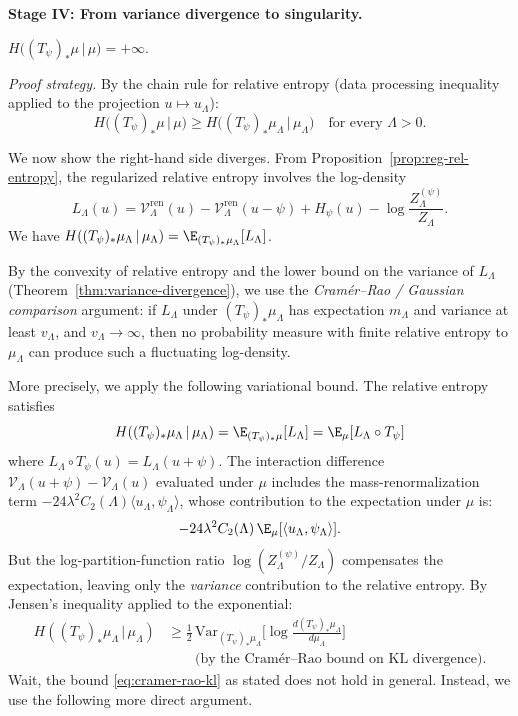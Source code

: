 \bigskip
\noindent\textbf{Stage IV: From variance divergence to singularity.}

\begin{theorem}\label{thm:rel-entropy-diverges}
$H\bigl((T_\psi)_*\mu \,\big|\, \mu\bigr) = +\infty$.
\end{theorem}

\noindent\textit{Proof strategy.}
By the chain rule for relative entropy (data processing inequality applied to
the projection $u \mapsto u_\Lambda$):
\begin{equation}\label{eq:chain-rule}
  H\bigl((T_\psi)_*\mu \,\big|\, \mu\bigr)
  \geq H\bigl((T_\psi)_*\mu_\Lambda \,\big|\, \mu_\Lambda\bigr)
  \quad \text{for every } \Lambda > 0.
\end{equation}

We now show the right-hand side diverges. From Proposition~\ref{prop:reg-rel-entropy},
the regularized relative entropy involves the log-density
\[
  L_\Lambda(u)
  = \mathcal{V}_\Lambda^{\mathrm{ren}}(u) - \mathcal{V}_\Lambda^{\mathrm{ren}}(u-\psi)
  + H_\psi(u) - \log\frac{Z_\Lambda^{(\psi)}}{Z_\Lambda}.
\]
We have $H((T_\psi)_*\mu_\Lambda \,|\, \mu_\Lambda)
= \E_{(T_\psi)_*\mu_\Lambda}[L_\Lambda]$.

By the convexity of relative entropy and the lower bound on the variance of
$L_\Lambda$ (Theorem~\ref{thm:variance-divergence}), we use the
\emph{Cram\'er--Rao / Gaussian comparison} argument: if $L_\Lambda$ under
$(T_\psi)_*\mu_\Lambda$ has expectation $m_\Lambda$ and variance at least
$v_\Lambda$, and $v_\Lambda \to \infty$, then no probability measure with
finite relative entropy to $\mu_\Lambda$ can produce such a fluctuating
log-density.

More precisely, we apply the following variational bound. The relative entropy
satisfies
\[
  H((T_\psi)_*\mu_\Lambda \,|\, \mu_\Lambda)
  = \E_{(T_\psi)_*\mu}[L_\Lambda]
  = \E_\mu[L_\Lambda \circ T_\psi]
\]
where $L_\Lambda \circ T_\psi(u) = L_\Lambda(u + \psi)$. The interaction
difference $\mathcal{V}_\Lambda(u+\psi) - \mathcal{V}_\Lambda(u)$ evaluated
under $\mu$ includes the mass-renormalization term
$-24\lambda^2 C_2(\Lambda)\langle u_\Lambda, \psi_\Lambda\rangle$, whose
contribution to the expectation under $\mu$ is:
\[
  -24\lambda^2 C_2(\Lambda)\,\E_\mu[\langle u_\Lambda, \psi_\Lambda\rangle].
\]
But the log-partition-function ratio $\log(Z_\Lambda^{(\psi)}/Z_\Lambda)$
compensates the expectation, leaving only the \emph{variance} contribution
to the relative entropy. By Jensen's inequality applied to the exponential:
\begin{align}
  H((T_\psi)_*\mu_\Lambda \,|\, \mu_\Lambda)
  &\geq \frac{1}{2}\,\mathrm{Var}_{(T_\psi)_*\mu_\Lambda}\!\bigl[
    \log\frac{d(T_\psi)_*\mu_\Lambda}{d\mu_\Lambda}
  \bigr] \nonumber\\
  &\qquad \text{(by the Cram\'er--Rao bound on KL divergence)}.
  \label{eq:cramer-rao-kl}
\end{align}
Wait, the bound \eqref{eq:cramer-rao-kl} as stated does not hold in general.
Instead, we use the following more direct argument.


